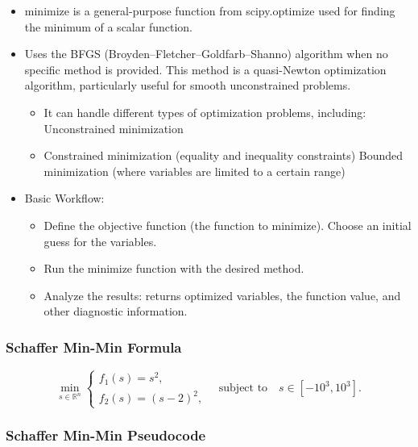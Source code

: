 \documentclass[
  letterpaper,
  DIV=11,
  numbers=noendperiod]{scrreprt}
\providecommand{\tightlist}{%
  \setlength{\itemsep}{0pt}\setlength{\parskip}{0pt}}\usepackage{longtable,booktabs,array}
\begin{document}
\begin{itemize}
\tightlist
\item
  minimize is a general-purpose function from scipy.optimize used for
  finding the minimum of a scalar function.
\item
  Uses the BFGS (Broyden--Fletcher--Goldfarb--Shanno) algorithm when no
  specific method is provided. This method is a quasi-Newton
  optimization algorithm, particularly useful for smooth unconstrained
  problems.

  \begin{itemize}
  \tightlist
  \item
    It can handle different types of optimization problems, including:
    Unconstrained minimization
  \item
    Constrained minimization (equality and inequality constraints)
    Bounded minimization (where variables are limited to a certain
    range)
  \end{itemize}
\item
  Basic Workflow:

  \begin{itemize}
  \tightlist
  \item
    Define the objective function (the function to minimize). Choose an
    initial guess for the variables.
  \item
    Run the minimize function with the desired method.
  \item
    Analyze the results: returns optimized variables, the function
    value, and other diagnostic information.
  \end{itemize}
\end{itemize}

\subsubsection{Schaffer Min-Min Formula}\label{schaffer-min-min-formula}

\[
\min_{s \in \mathbb{R}^n} 
\begin{cases}
f_1(s) = s^2, \\
f_2(s) = (s - 2)^2,
\end{cases}
\quad \text{subject to} \quad s \in [-10^3, 10^3].
\]

\subsubsection{Schaffer Min-Min
Pseudocode}\label{schaffer-min-min-pseudocode}
\end{document}
